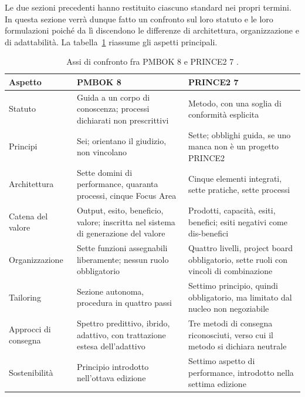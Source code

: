 Le due sezioni precedenti hanno restituito ciascuno standard nei propri termini.
In questa sezione verr\`a dunque fatto un confronto sul loro statuto e le loro formulazioni
poich\'e da l\`i discendono le differenze di architettura, organizzazione e di
adattabilit\`a. La tabella~\ref{tab:confronto-interno} riassume gli aspetti
principali.

\begin{table}[htbp]
\centering
\footnotesize
\linespread{1}\selectfont
\renewcommand{\arraystretch}{1.2}
\caption{Assi di confronto fra PMBOK 8 e PRINCE2 7 \cite{pmbok8,prince27}.}
\label{tab:confronto-interno}
\begin{tabularx}{\textwidth}{@{}>{\raggedright\arraybackslash}p{2.4cm}XX@{}}
\toprule
\textbf{Aspetto} & \textbf{PMBOK 8} & \textbf{PRINCE2 7} \\
\midrule
Statuto & Guida a un corpo di conoscenza; processi dichiarati non prescrittivi & Metodo, con una soglia di conformit\`a esplicita \\
Principi & Sei; orientano il giudizio, non vincolano & Sette; obblighi guida, se uno manca non \`e un progetto PRINCE2 \\
Architettura & Sette domini di performance, quaranta processi, cinque Focus Area & Cinque elementi integrati, sette pratiche, sette processi \\
Catena del valore & Output, esito, beneficio, valore; inscritta nel sistema di generazione del valore & Prodotti, capacit\`a, esiti, benefici; esiti negativi come dis-benefici \\
Organizzazione & Sette funzioni assegnabili liberamente; nessun ruolo obbligatorio & Quattro livelli, project board obbligatorio, sette ruoli con vincoli di combinazione \\
Tailoring & Sezione autonoma, procedura in quattro passi & Settimo principio, quindi obbligatorio, ma limitato dal nucleo non negoziabile \\
Approcci di consegna & Spettro predittivo, ibrido, adattivo, con trattazione estesa dell'adattivo & Tre metodi di consegna riconosciuti, verso cui il metodo si dichiara neutrale \\
Sostenibilit\`a & Principio introdotto nell'ottava edizione & Settimo aspetto di performance, introdotto nella settima edizione \\
\bottomrule
\end{tabularx}
\end{table}

